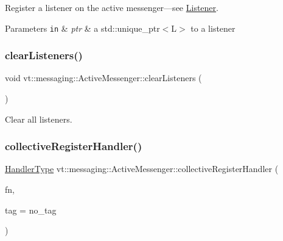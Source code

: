 Register a listener on the active messenger---see {\ttfamily \hyperlink{structvt_1_1messaging_1_1_listener}{Listener}}. 


\begin{DoxyParams}[1]{Parameters}
\mbox{\tt in}  & {\em ptr} & a {\ttfamily std\+::unique\+\_\+ptr$<$\+L$>$} to a listener \\
\hline
\end{DoxyParams}
\mbox{\label{structvt_1_1messaging_1_1_active_messenger_af7bcc5ce345c1138a67b6f80abb56705}} 
\subsubsection{\texorpdfstring{clear\+Listeners()}{clearListeners()}}
{\footnotesize\ttfamily void vt\+::messaging\+::\+Active\+Messenger\+::clear\+Listeners (\begin{DoxyParamCaption}{ }\end{DoxyParamCaption})\hspace{0.3cm}{\ttfamily [inline]}}



Clear all listeners. 

\mbox{\label{structvt_1_1messaging_1_1_active_messenger_a7e693e4b292e45fc1ed0dc8c9e2c03ec}} 
\subsubsection{\texorpdfstring{collective\+Register\+Handler()}{collectiveRegisterHandler()}}
{\footnotesize\ttfamily \hyperlink{namespacevt_af64846b57dfcaf104da3ef6967917573}{Handler\+Type} vt\+::messaging\+::\+Active\+Messenger\+::collective\+Register\+Handler (\begin{DoxyParamCaption}\item[{\hyperlink{namespacevt_a2a06c34cafcd511828f16cbf1476b924}{Active\+Closure\+Fn\+Type}}]{fn,  }\item[{\hyperlink{namespacevt_a84ab281dae04a52a4b243d6bf62d0e52}{Tag\+Type} const \&}]{tag = {\ttfamily no\+\_\+tag} }\end{DoxyParamCaption})}



